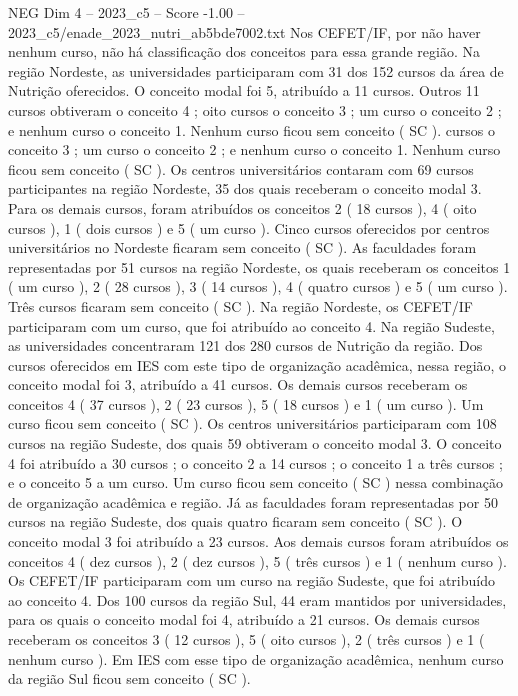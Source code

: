 \begin{textsample}{NEG Dim 4 – 2023\_c5 – Score -1.00 – 2023\_c5/enade\_2023\_nutri\_ab5bde7002.txt}
Nos CEFET/IF, por não haver nenhum curso, não há classificação dos conceitos para essa grande região.
Na região Nordeste, as universidades participaram com 31 dos 152 cursos da área de Nutrição oferecidos.
O conceito modal foi 5, atribuído a 11 cursos.
Outros 11 cursos obtiveram o conceito 4 ; oito cursos o conceito 3 ; um curso o conceito 2 ; e nenhum curso o conceito 1.
Nenhum curso ficou sem conceito ( SC ). cursos o conceito 3 ; um curso o conceito 2 ; e nenhum curso o conceito 1.
Nenhum curso ficou sem conceito ( SC ).
Os centros universitários contaram com 69 cursos participantes na região Nordeste, 35 dos quais receberam o conceito modal 3.
Para os demais cursos, foram atribuídos os conceitos 2 ( 18 cursos ), 4 ( oito cursos ), 1 ( dois cursos ) e 5 ( um curso ).
Cinco cursos oferecidos por centros universitários no Nordeste ficaram sem conceito ( SC ).
As faculdades foram representadas por 51 cursos na região Nordeste, os quais receberam os conceitos 1 ( um curso ), 2 ( 28 cursos ), 3 ( 14 cursos ), 4 ( quatro cursos ) e 5 ( um curso ).
Três cursos ficaram sem conceito ( SC ).
Na região Nordeste, os CEFET/IF participaram com um curso, que foi atribuído ao conceito 4.
Na região Sudeste, as universidades concentraram 121 dos 280 cursos de Nutrição da região.
Dos cursos oferecidos em IES com este tipo de organização acadêmica, nessa região, o conceito modal foi 3, atribuído a 41 cursos.
Os demais cursos receberam os conceitos 4 ( 37 cursos ), 2 ( 23 cursos ), 5 ( 18 cursos ) e 1 ( um curso ).
Um curso ficou sem conceito ( SC ).
Os centros universitários participaram com 108 cursos na região Sudeste, dos quais 59 obtiveram o conceito modal 3.
O conceito 4 foi atribuído a 30 cursos ; o conceito 2 a 14 cursos ; o conceito 1 a três cursos ; e o conceito 5 a um curso.
Um curso ficou sem conceito ( SC ) nessa combinação de organização acadêmica e região.
Já as faculdades foram representadas por 50 cursos na região Sudeste, dos quais quatro ficaram sem conceito ( SC ).
O conceito modal 3 foi atribuído a 23 cursos.
Aos demais cursos foram atribuídos os conceitos 4 ( dez cursos ), 2 ( dez cursos ), 5 ( três cursos ) e 1 ( nenhum curso ).
Os CEFET/IF participaram com um curso na região Sudeste, que foi atribuído ao conceito 4.
Dos 100 cursos da região Sul, 44 eram mantidos por universidades, para os quais o conceito modal foi 4, atribuído a 21 cursos.
Os demais cursos receberam os conceitos 3 ( 12 cursos ), 5 ( oito cursos ), 2 ( três cursos ) e 1 ( nenhum curso ).
Em IES com esse tipo de organização acadêmica, nenhum curso da região Sul ficou sem conceito ( SC ).

\end{textsample}
